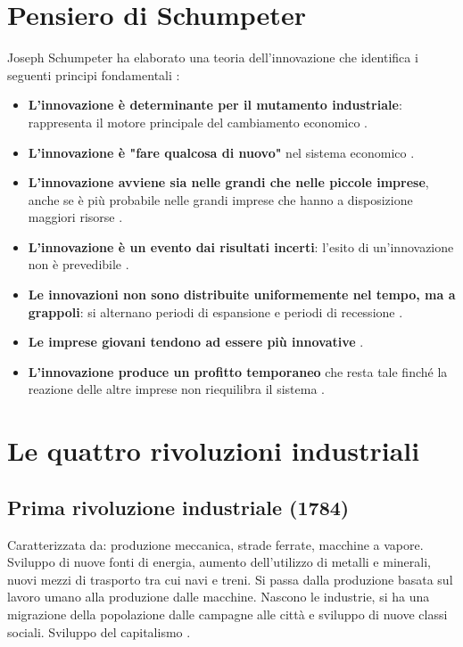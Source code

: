 \documentclass[12pt,a4paper]{article}
\begin{document}
\section{Pensiero di Schumpeter}

Joseph Schumpeter ha elaborato una teoria dell'innovazione che identifica i seguenti principi fondamentali :

\begin{itemize}
    \item \textbf{L'innovazione è determinante per il mutamento industriale}: rappresenta il motore principale del cambiamento economico .
    \item \textbf{L'innovazione è "fare qualcosa di nuovo"} nel sistema economico .
    \item \textbf{L'innovazione avviene sia nelle grandi che nelle piccole imprese}, anche se è più probabile nelle grandi imprese che hanno a disposizione maggiori risorse .
    \item \textbf{L'innovazione è un evento dai risultati incerti}: l'esito di un'innovazione non è prevedibile .
    \item \textbf{Le innovazioni non sono distribuite uniformemente nel tempo, ma a grappoli}: si alternano periodi di espansione e periodi di recessione .
    \item \textbf{Le imprese giovani tendono ad essere più innovative} .
    \item \textbf{L'innovazione produce un profitto temporaneo} che resta tale finché la reazione delle altre imprese non riequilibra il sistema .
\end{itemize}

\section{Le quattro rivoluzioni industriali}

\subsection{Prima rivoluzione industriale (1784)}
Caratterizzata da: produzione meccanica, strade ferrate, macchine a vapore. Sviluppo di nuove fonti di energia, aumento dell'utilizzo di metalli e minerali, nuovi mezzi di trasporto tra cui navi e treni. Si passa dalla produzione basata sul lavoro umano alla produzione dalle macchine. Nascono le industrie, si ha una migrazione della popolazione dalle campagne alle città e sviluppo di nuove classi sociali. Sviluppo del capitalismo .
\end{document}
